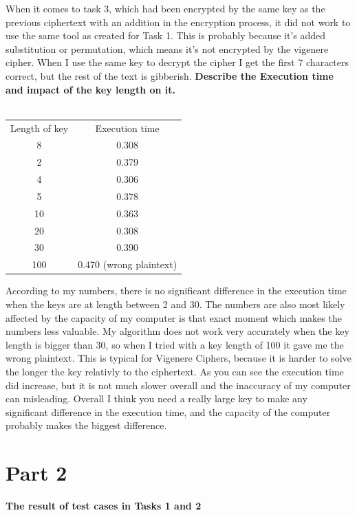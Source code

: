 \documentclass[12pt, letterpaper]{article}
\begin{document}
When it comes to task 3, which had been encrypted by the same key as the previous ciphertext with an addition in the encryption process, it did not work to use the same tool as created for Task 1. This is probably because it's added substitution or permutation, which means it's not encrypted by the vigenere cipher. When I use the same key to decrypt the cipher I get the first 7 characters correct, but the rest of the text is gibberish.
\newpage 
\textbf{Describe the Execution time and impact of the key length on it.}
\\ \\
\begin{center}
\begin{tabular}{ |c|c| } 
 \hline
 Length of key & Execution time \\
 8 & 0.308 \\ 
 2 & 0.379 \\
 4 & 0.306 \\
 5 & 0.378 \\
 10 & 0.363 \\
 20 & 0.308 \\
 30 & 0.390 \\
 100 & 0.470 (wrong plaintext) \\
 \hline
\end{tabular}
\end{center}

According to my numbers, there is no significant difference in the execution time when the keys are at length between 2 and 30. The numbers are also most likely affected by the capacity of my computer is that exact moment which makes the numbers less valuable. My algorithm does not work very accurately when the key length is bigger than 30, so when I tried with a key length of 100 it gave me the wrong plaintext. This is typical for Vigenere Ciphers, because it is harder to solve the longer the key relativly to the ciphertext. As you can see the execution time did increase, but it is not much slower overall and the inaccuracy of my computer can misleading. Overall I think you need a really large key to make any significant difference in the execution time, and the capacity of the computer probably makes the biggest difference.
\newpage
\section*{Part 2}
\textbf{The result of test cases in Tasks 1 and 2}
\end{document}
